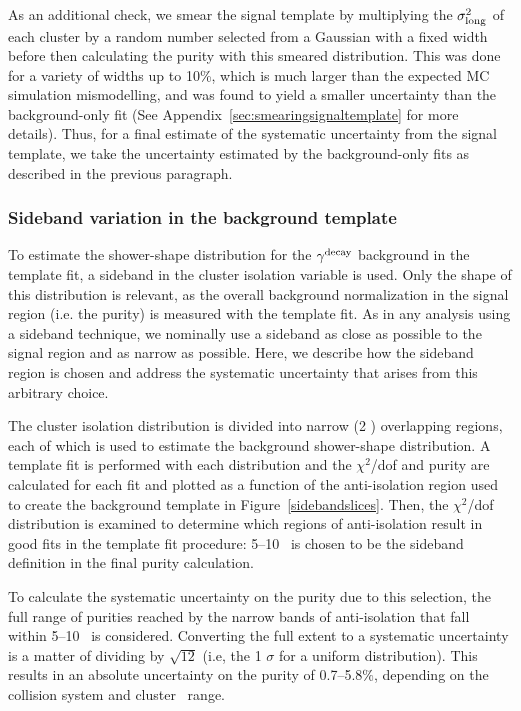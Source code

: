 As an additional check, we smear the signal template by multiplying the $\sigma^{2}_{\mathrm{long}}$ of each cluster by a random number selected from a Gaussian with a fixed width before then calculating the purity with this smeared distribution. This was done for a variety of widths up to 10\%, which is much larger than the expected MC simulation mismodelling, and was found to yield a smaller uncertainty than the background-only fit (See Appendix~\ref{sec:smearingsignaltemplate} for more details). Thus, for a final estimate of the systematic uncertainty from the signal template, we take the uncertainty estimated by the background-only fits as described in the previous paragraph.

\FloatBarrier
\subsubsection{Sideband variation in the background template}
\label{sec:bkgtemplate}
To estimate the shower-shape distribution for the $\gamma^\mathrm{decay}$ background in the template fit, a sideband in the cluster isolation variable is used. Only the shape of this distribution is relevant, as the overall background normalization in the signal region (i.e. the purity) is measured with the template fit. As in any analysis using a sideband technique, we nominally use a sideband as close as possible to the signal region and as narrow as possible. Here, we describe how the sideband region is chosen and address the systematic uncertainty that arises from this arbitrary choice.

The cluster isolation distribution is divided into narrow (2 \GeVc) overlapping regions, each of which is used to estimate the background shower-shape distribution. A template fit is performed with each distribution and the $\chi^2$/dof and purity are calculated for each fit and plotted as a function of the anti-isolation region used to create the background template in Figure~\ref{sidebandslices}. Then, the $\chi^2$/dof distribution is examined to determine which regions of anti-isolation result in good fits in the template fit procedure: 5--10 \GeVc~is chosen to be the sideband definition in the final purity calculation.

To calculate the systematic uncertainty on the purity due to this selection, the full range of purities reached by the narrow bands of anti-isolation that fall within 5--10 \GeVc~is considered. Converting the full extent to a systematic uncertainty is a matter of dividing by $\sqrt{12}$ (i.e, the 1 $\sigma$ for a uniform distribution). This results in an absolute uncertainty on the purity of 0.7--5.8$\%$, depending on the collision system and cluster \pt~range.


